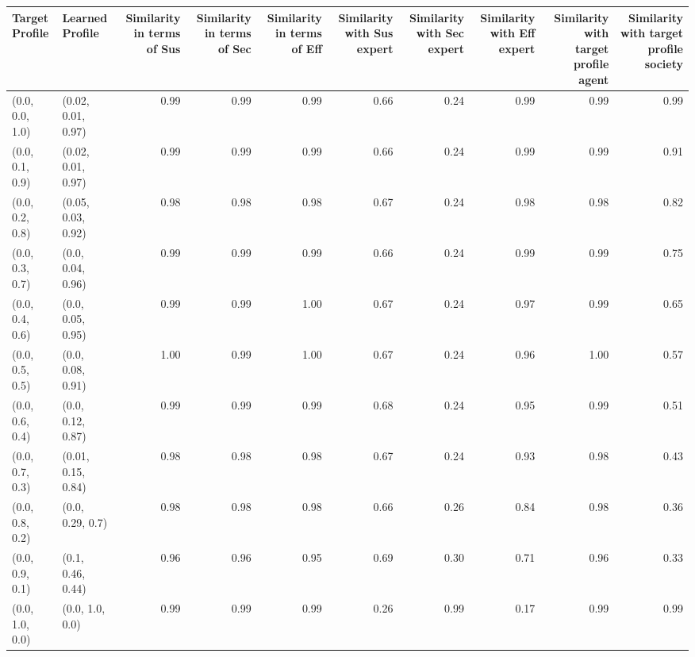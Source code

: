 \begin{tabular}{llrrrrrrrr}
\toprule
Target Profile & Learned Profile & Similarity in terms of Sus & Similarity in terms of Sec & Similarity in terms of Eff & Similarity with Sus expert & Similarity with Sec expert & Similarity with Eff expert & Similarity with target profile agent & Similarity with target profile society \\
\midrule
(0.0, 0.0, 1.0) & (0.02, 0.01, 0.97) & 0.99 & 0.99 & 0.99 & 0.66 & 0.24 & 0.99 & 0.99 & 0.99 \\
(0.0, 0.1, 0.9) & (0.02, 0.01, 0.97) & 0.99 & 0.99 & 0.99 & 0.66 & 0.24 & 0.99 & 0.99 & 0.91 \\
(0.0, 0.2, 0.8) & (0.05, 0.03, 0.92) & 0.98 & 0.98 & 0.98 & 0.67 & 0.24 & 0.98 & 0.98 & 0.82 \\
(0.0, 0.3, 0.7) & (0.0, 0.04, 0.96) & 0.99 & 0.99 & 0.99 & 0.66 & 0.24 & 0.99 & 0.99 & 0.75 \\
(0.0, 0.4, 0.6) & (0.0, 0.05, 0.95) & 0.99 & 0.99 & 1.00 & 0.67 & 0.24 & 0.97 & 0.99 & 0.65 \\
(0.0, 0.5, 0.5) & (0.0, 0.08, 0.91) & 1.00 & 0.99 & 1.00 & 0.67 & 0.24 & 0.96 & 1.00 & 0.57 \\
(0.0, 0.6, 0.4) & (0.0, 0.12, 0.87) & 0.99 & 0.99 & 0.99 & 0.68 & 0.24 & 0.95 & 0.99 & 0.51 \\
(0.0, 0.7, 0.3) & (0.01, 0.15, 0.84) & 0.98 & 0.98 & 0.98 & 0.67 & 0.24 & 0.93 & 0.98 & 0.43 \\
(0.0, 0.8, 0.2) & (0.0, 0.29, 0.7) & 0.98 & 0.98 & 0.98 & 0.66 & 0.26 & 0.84 & 0.98 & 0.36 \\
(0.0, 0.9, 0.1) & (0.1, 0.46, 0.44) & 0.96 & 0.96 & 0.95 & 0.69 & 0.30 & 0.71 & 0.96 & 0.33 \\
(0.0, 1.0, 0.0) & (0.0, 1.0, 0.0) & 0.99 & 0.99 & 0.99 & 0.26 & 0.99 & 0.17 & 0.99 & 0.99 \\
\bottomrule
\end{tabular}
